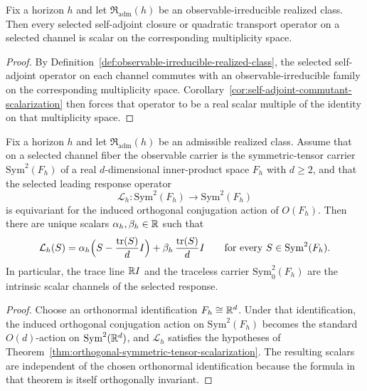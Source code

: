 \begin{corollary}
\label{cor:realized-self-adjoint-scalarization}
Fix a horizon $h$ and let $\mathfrak R_{\mathrm{adm}}(h)$ be an
observable-irreducible realized class. Then every selected self-adjoint
closure or quadratic transport operator on a selected channel is scalar on the
corresponding multiplicity space.
\end{corollary}

\begin{proof}
By Definition~\ref{def:observable-irreducible-realized-class}, the selected
self-adjoint operator on each channel commutes with an observable-irreducible
family on the corresponding multiplicity space. Corollary~\ref{cor:self-adjoint-commutant-scalarization}
then forces that operator to be a real scalar multiple of the identity on that
multiplicity space.
\end{proof}

\begin{corollary}
\label{cor:realized-isotropic-symmetric-response-scalarization}
Fix a horizon $h$ and let $\mathfrak R_{\mathrm{adm}}(h)$ be an admissible
realized class. Assume that on a selected channel fiber the observable carrier
is the symmetric-tensor carrier $\mathrm{Sym}^2(F_h)$ of a real
$d$-dimensional inner-product space $F_h$ with $d\ge 2$, and that the selected
leading response operator
\[
\mathcal L_h:\mathrm{Sym}^2(F_h)\to \mathrm{Sym}^2(F_h)
\]
is equivariant for the induced orthogonal conjugation action of $O(F_h)$.
Then there are unique scalars $\alpha_h,\beta_h\in\mathbb{R}$ such that
\[
\mathcal L_h(S)
=
\alpha_h\Bigl(S-\frac{\operatorname{tr}(S)}{d}I\Bigr)
+
\beta_h\,\frac{\operatorname{tr}(S)}{d}I
\qquad\text{for every }S\in \mathrm{Sym}^2(F_h).
\]
In particular, the trace line $\mathbb{R} I$ and the traceless carrier
$\mathrm{Sym}^2_0(F_h)$ are the intrinsic scalar channels of the selected
response.
\end{corollary}

\begin{proof}
Choose an orthonormal identification $F_h\cong \mathbb{R}^d$. Under that
identification, the induced orthogonal conjugation action on
$\mathrm{Sym}^2(F_h)$ becomes the standard $O(d)$-action on
$\mathrm{Sym}^2(\mathbb{R}^d)$, and $\mathcal L_h$ satisfies the hypotheses of
Theorem~\ref{thm:orthogonal-symmetric-tensor-scalarization}. The resulting
scalars are independent of the chosen orthonormal identification because the
formula in that theorem is itself orthogonally invariant.
\end{proof}

